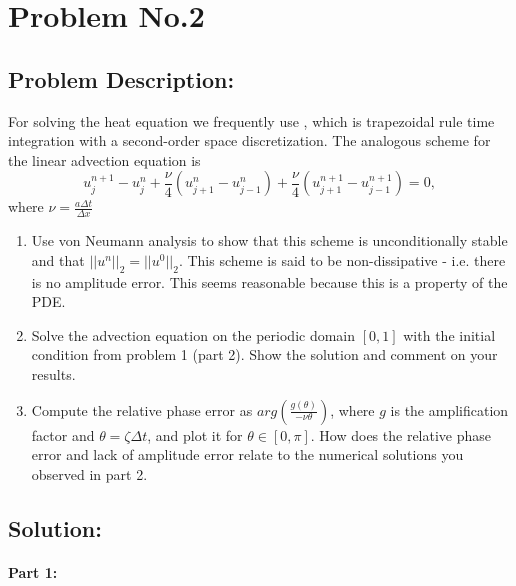 \section{Problem No.2} \label{sec:prob2}
\subsection{Problem Description:} 
For solving the heat equation we frequently use \protect{\cn}, which is trapezoidal rule time integration with a second-order space discretization. The analogous scheme for the linear advection equation is 
$$
u_{j}^{n+1} - u_{j}^{n} + \frac{\nu}{4}(u_{j+1}^{n}-u_{j-1}^{n}) + \frac{\nu}{4}(u_{j+1}^{n+1}-u_{j-1}^{n+1}) =0,
$$
where $\nu = \frac{a\Delta t}{\Delta x}$
\begin{enumerate}
\item Use von Neumann analysis to show that this scheme is unconditionally stable and that $||u^{n}||_{2} = ||u^{0}||_{2}$. This scheme is said to be non-dissipative - i.e. there is no amplitude error. This seems reasonable because this is a property of the PDE.
\item Solve the advection equation on the periodic domain $[0,1]$ with the initial condition from problem 1 (part 2). Show the solution and comment on your results.
\item Compute the relative phase error as $arg(\frac{g(\theta)}{-\nu \theta})$, where $g$ is the amplification factor and $\theta=\zeta \Delta t$, and plot it for $\theta \in [0,\pi]$. How does the relative phase error and lack of amplitude error relate to the numerical solutions you observed in part 2. 
\end{enumerate}

\subsection{Solution:}
\paragraph{Part 1:}